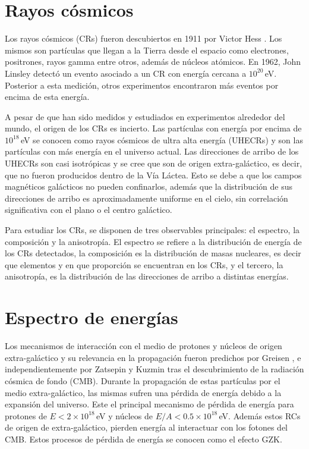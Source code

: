 \section{Rayos cósmicos}
Los rayos cósmicos (CRs) fueron descubiertos en 1911 por Victor Hess \cite{hess1912}. Los mismos son partículas que llegan a la Tierra desde el espacio como  electrones, positrones, rayos gamma entre otros, además de núcleos atómicos. En 1962, John Linsley detectó un evento asociado a un CR con energía cercana a $10^{20}\,$eV. Posterior a esta medición, otros experimentos encontraron más eventos por encima de esta energía. 

A pesar de que han sido medidos y estudiados en experimentos alrededor del mundo, el origen de los CRs es incierto. Las partículas con energía por encima de $10^{18}\,$eV se conocen como rayos cósmicos de ultra alta energía (UHECRs) y son las partículas con más energía en el universo actual. Las direcciones de arribo de los UHECRs son casi isotrópicas  \cite{collaboration2013pierre} \cite{data} y se cree que son de origen extra-galáctico, es decir, que no fueron producidos dentro de la Vía Láctea. Esto se debe a que los campos magnéticos galácticos no pueden confinarlos, además que la distribución de sus direcciones de arribo es aproximadamente uniforme en el cielo, sin correlación significativa con el plano o el centro galáctico. 

Para estudiar los CRs, se disponen de tres observables principales: el espectro, la composición y la anisotropía. El espectro se refiere a la distribución de energía de los CRs detectados, la composición es la distribución de masas nucleares, es decir que elementos y en que proporción se encuentran en los CRs, y el tercero, la anisotropía, es la distribución de las direcciones de arribo a distintas energías.

\section{Espectro de energías}
Los mecanismos de interacción con el medio de protones y núcleos de origen extra-galáctico y su relevancia en la propagación fueron predichos por Greisen \cite{greisen1966end}, e independientemente por Zatsepin y Kuzmin \cite{zatsepin1966upper} tras el descubrimiento de la radiación cósmica de fondo (CMB). Durante la propagación  de estas  partículas por el medio extra-galáctico, las mismas sufren una pérdida de energía debido a la expansión del universo. Este el principal mecanismo de pérdida de energía para protones de $E < 2\times 10^{18}\,$eV y núcleos de $E/A < 0.5\times 10^{18}\,$eV. Además estos RCs de origen de extra-galáctico, pierden energía al interactuar con los fotones del  CMB.  Estos procesos de pérdida de energía se conocen como el efecto GZK.


